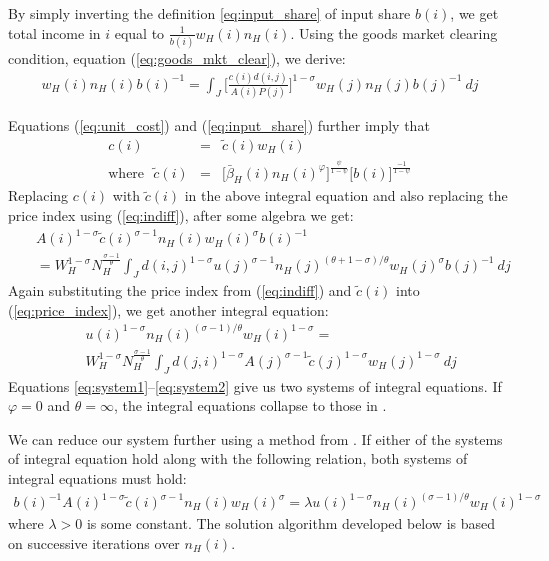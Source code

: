 \documentclass[12 pt]{article}
\begin{document}
By simply inverting the definition \eqref{eq:input_share} of input share $b(i)$, we get total income in $i$ equal to $\frac{1}{b(i)} w_H(i)n_H(i)$. Using the goods market clearing condition, equation (\ref{eq:goods_mkt_clear}), we derive: 
\begin{eqnarray}
	w_H(i) n_H(i) b(i)^{-1} = 
	\int_J \Big[ \frac{c(i) d(i,j)}{A(i) P(j)} \Big]^{1-\sigma} w_H(j) n_H(j) b(j)^{-1} ~dj \nonumber
\end{eqnarray}

Equations (\ref{eq:unit_cost}) and (\ref{eq:input_share}) further imply that 
\begin{eqnarray}\label{eq:ctilde}
	c(i) & = & \tilde{c}(i) w_H(i) \nonumber \\
    \mbox{where}~~~ \tilde{c}(i) & = & 
	\Big[\bar{\beta}_H(i) n_H(i)^{\varphi}\Big] ^{\frac{\psi}{1-\psi}} \Big[b(i)\Big]^{\frac{-1}{1-\psi}}
\end{eqnarray}
Replacing $c(i)$ with $\tilde{c}(i)$ in the above integral equation and also replacing the price index using (\ref{eq:indiff}), after some algebra we get:
\begin{eqnarray}\label{eq:system1}
	& & A(i)^{1-\sigma} \tilde{c}(i)^{\sigma-1} n_H(i)  w_H(i)^{\sigma}  b(i)^{-1}  \nonumber \\
	& & =  
    W_H^{1-\sigma} N_H^{\frac{\sigma-1}{\theta}}
    \int_J d(i,j)^{1-\sigma} u(j)^{\sigma-1} n_H(j)^{(\theta+1-\sigma)/\theta} w_H(j)^{\sigma} b(j)^{-1}  ~dj
\end{eqnarray}
Again substituting the price index from (\ref{eq:indiff}) and $\tilde{c}(i)$ into (\ref{eq:price_index}), we get another integral equation: 
\begin{eqnarray}\label{eq:system2}
 	& &  u(i)^{1-\sigma} n_H(i)^{(\sigma-1)/\theta} w_H(i)^{1-\sigma}  = \nonumber \\ 
 	& & 
    W_H^{1-\sigma} N_H^{\frac{\sigma-1}{\theta}}
 	\int_J  d(j,i)^{1-\sigma} A(j)^{\sigma-1}  \tilde{c}(j)^{1-\sigma} w_H(j)^{1-\sigma}
 	~ dj
\end{eqnarray}
Equations \ref{eq:system1}--\ref{eq:system2} give us two systems of integral equations. If $\varphi=0$ and $\theta=\infty$, the integral equations collapse to those in \citet{allen2014trade}. 

We can reduce our system further using a method from \citet{allen2014trade}.  If either of the systems of integral equation hold along with the following relation, both systems of integral equations must hold:
\begin{eqnarray}\label{eq:systems_relation}
	  b(i)^{-1}  A(i)^{1-\sigma} \tilde{c}(i)^{\sigma-1} n_H(i)  w_H(i)^{\sigma} = \lambda  u(i)^{1-\sigma} n_H(i)^{(\sigma-1)/\theta} w_H(i)^{1-\sigma}
\end{eqnarray}
where $\lambda > 0$ is some constant.  The solution algorithm developed below is based on successive iterations over  $n_H(i)$.
\end{document}
